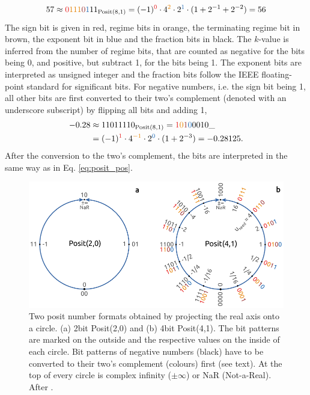 \documentclass[draft]{agujournal2019}
\newcommand{\op}{\operatorname}
\begin{document}
\begin{equation}
57 \approx {\color{psign}0}{\color{pregime}111}{\color{pregimet}0}{\color{pexpo}1}11_{\op{Posit}(8,1)} = (-1)^{\color{psign}0} \cdot 4^{\color{pregime}2} \cdot 2^{\color{pexpo}1} \cdot (1+2^{-1}+2^{-2}) = 56
\label{eq:posit_pos}
\end{equation}
The sign bit is given in red, regime bits in orange, the terminating regime bit in brown, the exponent bit in blue and the fraction bits in black. The $k$-value is inferred from the number of regime bits, that are counted as negative for the bits being 0, and positive, but subtract 1, for the bits being 1. The exponent bits are interpreted as unsigned integer and the fraction bits follow the IEEE floating-point standard for significant bits. For negative numbers, i.e. the sign bit being 1, all other bits are first converted to their two's complement (denoted with an underscore subscript) by flipping all bits and adding 1,
\begin{equation}
\begin{split}
-0.28 &  \approx 11011110_{\op{Posit}(8,1)} = {\color{psign}1}{\color{pregime}0}{\color{pregimet}1}{\color{pexpo}0}0010\_ \\
& = (-1)^{\color{psign}1} \cdot 4^{\color{pregime}-1} \cdot 2^{\color{pexpo}0} \cdot (1+2^{-3}) = -0.28125.
\end{split}
\label{eq:2comp}
\end{equation}
After the conversion to the two's complement, the bits are interpreted in the same way as in Eq. \ref{eq:posit_pos}.

\begin{figure}[htbp]
\center
\includegraphics[width=1\textwidth]{figs/circles.pdf}
\caption{Two posit number formats obtained by projecting the real axis onto a circle. (a) 2bit Posit(2,0) and (b) 4bit Posit(4,1). The bit patterns are marked on the outside and the respective values on the inside of each circle. Bit patterns of negative numbers (black) have to be converted to their two's complement (colours) first (see text). At the top of every circle is complex infinity ($\pm \infty$) or NaR (Not-a-Real). After . }
\label{fig:circle}
\end{figure}
\end{document}

